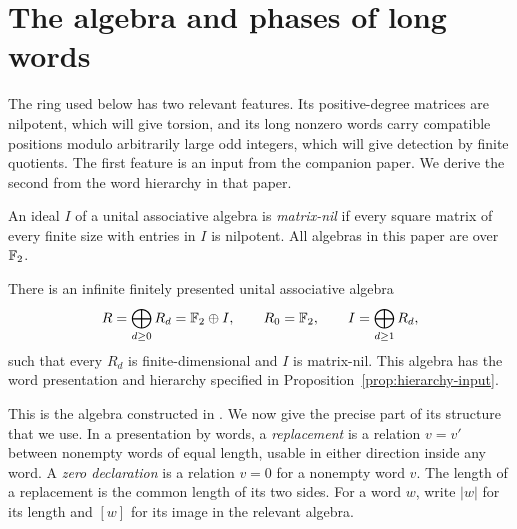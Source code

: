 \section{The algebra and phases of long words}\label{sec:ring-phases}

The ring used below has two relevant features.  Its positive-degree
matrices are nilpotent, which will give torsion, and its long nonzero
words carry compatible positions modulo arbitrarily large odd integers,
which will give detection by finite quotients.  The first feature is an
input from the companion paper.  We derive the second from the word
hierarchy in that paper.

An ideal $I$ of a unital associative algebra is \emph{matrix-nil} if
every square matrix of every finite size with entries in $I$ is
nilpotent.  All algebras in this paper are over $\mathbb F_2$.

\begin{proposition}\label{prop:ring-input}
There is an infinite finitely presented unital associative algebra
\[
 R=\bigoplus_{d\geq0}R_d=\mathbb F_2\oplus I,
 \qquad R_0=\mathbb F_2,
 \qquad I=\bigoplus_{d\geq1}R_d,
\]
such that every $R_d$ is finite-dimensional and $I$ is matrix-nil.
This algebra has the word presentation and hierarchy specified in
Proposition~\ref{prop:hierarchy-input}.
\end{proposition}

This is the algebra constructed in \cite[Theorem~3.7]{Companion}.
We now give the precise part of its structure that we use.  In a
presentation by words, a \emph{replacement} is a relation $v=v'$
between nonempty words of equal length, usable in either direction
inside any word.  A \emph{zero declaration} is a relation $v=0$ for a
nonempty word $v$.  The length of a replacement is the common length
of its two sides.  For a word $w$, write $|w|$ for its length and $[w]$
for its image in the relevant algebra.

